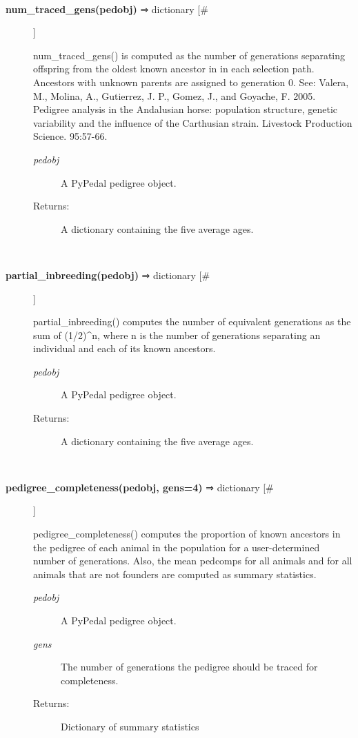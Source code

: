 \begin{description}
\begin{description}
\end{description}
\\ 

\item[\textbf{num\_traced\_gens(pedobj)}
 ⇒ dictionary [\#]]

 num\_traced\_gens() is computed as the number of generations separating offspring from the oldest known ancestor in in each selection path. Ancestors with unknown parents are assigned to generation 0. See: Valera, M., Molina, A., Gutierrez, J. P., Gomez, J., and Goyache, F. 2005. Pedigree analysis in the Andalusian horse: population structure, genetic variability and the influence of the Carthusian strain. Livestock Production Science. 95:57-66.
\begin{description}
\item[\emph{pedobj}
] A PyPedal pedigree object.
\item[Returns:] A dictionary containing the five average ages.

\end{description}
\\ 

\item[\textbf{partial\_inbreeding(pedobj)}
 ⇒ dictionary [\#]]

 partial\_inbreeding() computes the number of equivalent generations as the sum of (1/2)\^{}n, where n is the number of generations separating an individual and each of its known ancestors.
\begin{description}
\item[\emph{pedobj}
] A PyPedal pedigree object.
\item[Returns:] A dictionary containing the five average ages.

\end{description}
\\ 

\item[\textbf{pedigree\_completeness(pedobj, gens=4)}
 ⇒ dictionary [\#]]

 pedigree\_completeness() computes the proportion of known ancestors in the pedigree of each animal in the population for a user-determined number of generations. Also, the mean pedcomps for all animals and for all animals that are not founders are computed as summary statistics.
\begin{description}
\item[\emph{pedobj}
] A PyPedal pedigree object.
\item[\emph{gens}
] The number of generations the pedigree should be traced for completeness.
\item[Returns:] Dictionary of summary statistics


\end{description}
\end{description}
